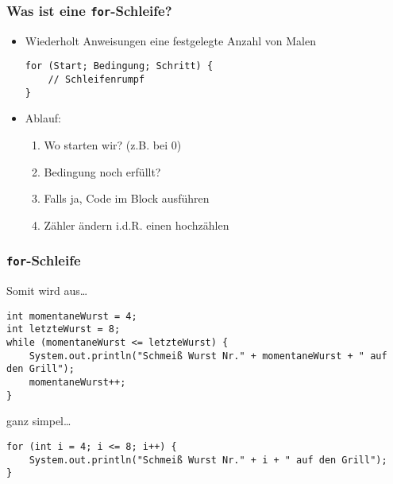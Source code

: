 \documentclass{../../presentation}
\begin{document}
\begin{frame}[fragile]
  \frametitle{Was ist eine \texttt{for}-Schleife?}
  \pause
  \begin{itemize}
    \item Wiederholt Anweisungen eine festgelegte Anzahl von Malen
          \pause
          \begin{verbatim}
for (Start; Bedingung; Schritt) {
    // Schleifenrumpf
}
\end{verbatim}
          \pause
    \item Ablauf:
          \pause
          \begin{enumerate}
            \item Wo starten wir? (z.B. bei 0)
                  \pause
            \item Bedingung noch erfüllt?
                  \pause
            \item Falls ja, Code im Block ausführen
                  \pause
            \item Zähler ändern i.d.R. einen hochzählen
          \end{enumerate}
  \end{itemize}
\end{frame}



\begin{frame}[fragile]
  \frametitle{\texttt{for}-Schleife}
  \pause
  Somit wird aus\dots

  \begin{verbatim}
int momentaneWurst = 4;
int letzteWurst = 8;
while (momentaneWurst <= letzteWurst) {
    System.out.println("Schmeiß Wurst Nr." + momentaneWurst + " auf den Grill");
    momentaneWurst++;
}
  \end{verbatim}
  \pause
  ganz simpel\dots
  \begin{verbatim}
for (int i = 4; i <= 8; i++) {
    System.out.println("Schmeiß Wurst Nr." + i + " auf den Grill");
}
  \end{verbatim}

\end{frame}
\end{document}

